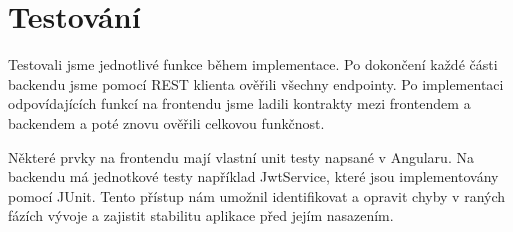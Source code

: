 \section{Testování}

Testovali jsme jednotlivé funkce během implementace. Po dokončení každé části
backendu jsme pomocí REST klienta ověřili všechny endpointy. Po implementaci
odpovídajících funkcí na frontendu jsme ladili kontrakty mezi frontendem a
backendem a poté znovu ověřili celkovou funkčnost.

Některé prvky na frontendu mají vlastní unit testy napsané v Angularu. Na
backendu má jednotkové testy například JwtService, které jsou implementovány
pomocí JUnit. Tento přístup nám umožnil identifikovat a opravit chyby v raných
fázích vývoje a zajistit stabilitu aplikace před jejím nasazením.

